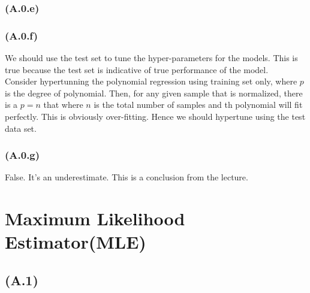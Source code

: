 \documentclass[]{article}
\begin{document}
        \subsubsection*{(A.0.e)}

        \subsubsection*{(A.0.f)}
            We should use the test set to tune the hyper-parameters for the models. This is true because the test set is indicative of true performance of the model. 
            \\
            Consider hypertunning the polynomial regression using training set only, where $p$ is the degree of polynomial. Then, for any given sample that is normalized, there is a $p = n$ that where $n$ is the total number of samples and th polynomial will fit perfectly. This is obviously over-fitting. Hence we should hypertune using the test data set. 
        \subsubsection*{(A.0.g)}
            False. It's an underestimate. This is a conclusion from the lecture. 

\section*{Maximum Likelihood Estimator(MLE)}
    \subsection*{(A.1)}
\end{document}
